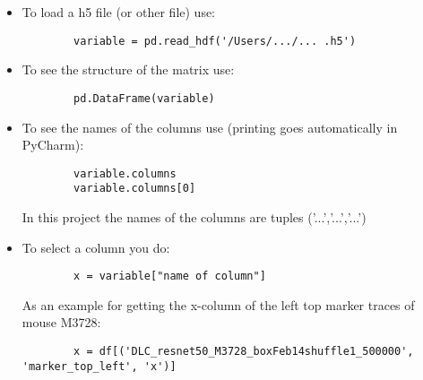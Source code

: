 \documentclass{article}
\begin{document}
\begin{itemize}
    \item To load a h5 file (or other file) use:
    \begin{verbatim}
        variable = pd.read_hdf('/Users/.../... .h5')
    \end{verbatim}
    
    \item To see the structure of the matrix use:
    \begin{verbatim}
        pd.DataFrame(variable)
    \end{verbatim}
    
    \item To see the names of the columns use (printing goes automatically in PyCharm):
    \begin{verbatim}
        variable.columns
        variable.columns[0]
    \end{verbatim}
    In this project the names of the columns are tuples ('...','...','...')
    
    \item To select a column you do:
    \begin{verbatim}
        x = variable["name of column"]
    \end{verbatim}
    As an example for getting the x-column of the left top marker traces of mouse M3728:
    \begin{verbatim}
        x = df[('DLC_resnet50_M3728_boxFeb14shuffle1_500000', 'marker_top_left', 'x')]
    \end{verbatim}
\end{itemize}
\end{document}
